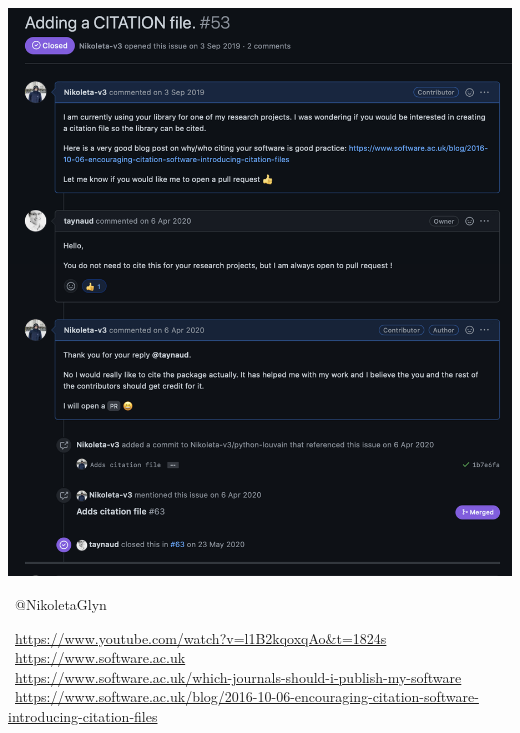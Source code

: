 \documentclass{beamer}
\begin{document}
\begin{frame}
    \begin{center}
    \includegraphics[width=.7\textwidth]{static/issue.png}
    \end{center}
\end{frame}

\begin{frame}
    \begin{center}
        \small
    \faTwitter \ @NikoletaGlyn \\
    \vspace{.75cm}

    \ \url{https://www.youtube.com/watch?v=l1B2kqoxqAo&t=1824s} \\
    \ \url{https://www.software.ac.uk} \\
    \ \url{https://www.software.ac.uk/which-journals-should-i-publish-my-software} \\
    \ \url{https://www.software.ac.uk/blog/2016-10-06-encouraging-citation-software-introducing-citation-files} \\
    \end{center}
\end{frame}
\end{document}
